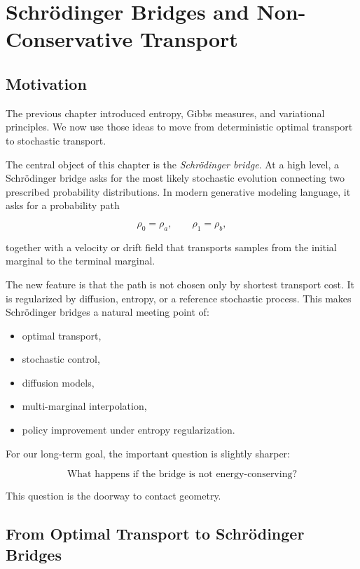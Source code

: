 
\chapter{Schr\"odinger Bridges and Non-Conservative Transport}

\section{Motivation}

The previous chapter introduced entropy, Gibbs measures, and variational
principles. We now use those ideas to move from deterministic optimal
transport to stochastic transport.

The central object of this chapter is the \emph{Schr\"odinger bridge}. At a
high level, a Schr\"odinger bridge asks for the most likely stochastic
evolution connecting two prescribed probability distributions. In modern
generative modeling language, it asks for a probability path

\[
\rho_0=\rho_a,
\qquad
\rho_1=\rho_b,
\]

together with a velocity or drift field that transports samples from the
initial marginal to the terminal marginal.

The new feature is that the path is not chosen only by shortest transport
cost. It is regularized by diffusion, entropy, or a reference stochastic
process. This makes Schr\"odinger bridges a natural meeting point of:

\begin{itemize}
    \item optimal transport,
    \item stochastic control,
    \item diffusion models,
    \item multi-marginal interpolation,
    \item policy improvement under entropy regularization.
\end{itemize}

For our long-term goal, the important question is slightly sharper:

\[
\text{What happens if the bridge is not energy-conserving?}
\]

This question is the doorway to contact geometry.

\section{From Optimal Transport to Schr\"odinger Bridges}

